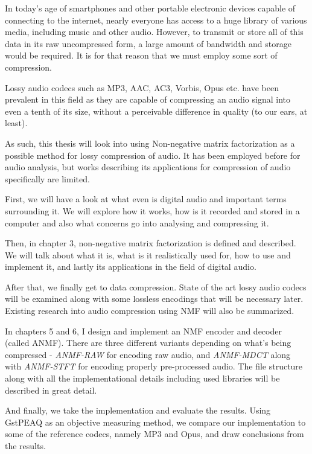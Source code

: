 In today's age of smartphones and other portable electronic devices capable of connecting to the internet, nearly everyone has access to a huge library of various media, including music and other audio. However, to transmit or store all of this data in its raw uncompressed form, a large amount of bandwidth and storage would be required. It is for that reason that we must employ some sort of compression.

Lossy audio codecs such as MP3, AAC, AC3, Vorbis, Opus etc. have been prevalent in this field as they are capable of compressing an audio signal into even a tenth of its size, without a perceivable difference in quality (to our ears, at least).

As such, this thesis will look into using Non-negative matrix factorization as a possible method for lossy compression of audio. It has been employed before for audio analysis, but works describing its applications for compression of audio specifically are limited.

First, we will have a look at what even is digital audio and important terms surrounding it. We will explore how it works, how is it recorded and stored in a computer and also what concerns go into analysing and compressing it.

Then, in chapter 3, non-negative matrix factorization is defined and described. We will talk about what it is, what is it realistically used for, how to use and implement it, and lastly its applications in the field of digital audio.

After that, we finally get to data compression. State of the art lossy audio codecs will be examined along with some lossless encodings that will be necessary later. Existing research into audio compression using NMF will also be summarized.

In chapters 5 and 6, I design and implement an NMF encoder and decoder (called ANMF). There are three different variants depending on what's being compressed - \emph{ANMF-RAW} for encoding raw audio, and \emph{ANMF-MDCT} along with \emph{ANMF-STFT} for encoding properly pre-processed audio. The file structure along with all the implementational details including used libraries will be described in great detail.

And finally, we take the implementation and evaluate the results. Using GstPEAQ as an objective measuring method, we compare our implementation to some of the reference codecs, namely MP3 and Opus, and draw conclusions from the results.
